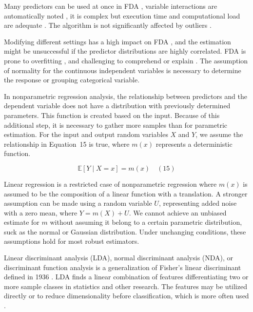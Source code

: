 \documentclass[preprint,12pt]{elsarticle}
\begin{document}
Many predictors can be used at once in FDA \cite{hastie2009elements}, variable interactions are automatically noted \cite{hastie1994flexible}, it is complex but execution time and computational load are adequate \cite{reynes2006choice}. The algorithm is not significantly affected by outliers \cite{phillips2017applying}.

Modifying different settings has a high impact on FDA \cite{hallgren2019species}, and the estimation might be unsuccessful if the predictor distributions are highly correlated. FDA is prone to overfitting \cite{thuiller2016ensemble}, and challenging to comprehend or explain \cite{quillfeldt2017influence}. The assumption of normality for the continuous independent variables is necessary \cite{zhang2019using} to determine the response or grouping categorical variable. 

In nonparametric regression analysis, the relationship between predictors and the dependent variable does not have a distribution with previously determined parameters. This function is created based on the input. Because of this additional step, it is necessary to gather more samples than for parametric estimation. For the input and output random variables $X$ and $Y$, we assume the relationship in Equation~15 is true, where $m\left(x\right)$ represents a deterministic function.

\begin{equation}
	\mathbb{E}[Y\mid X=x]=m\left(x\right)
	\quad\left(15\right)
\end{equation}

Linear regression is a restricted case of nonparametric regression where $m\left(x\right)$ is assumed to be the composition of a linear function with a translation. A stronger assumption can be made using a random variable $U$, representing added noise with a zero mean, where $Y=m\left(X\right)+U$. We cannot achieve an unbiased estimate for $m$ without assuming it belong to a certain parametric distribution, suck as the normal or Gaussian distribution. Under unchanging conditions, these assumptions hold for most robust estimators.

Linear discriminant analysis (LDA), normal discriminant analysis (NDA), or discriminant function analysis is a generalization of Fisher's linear discriminant defined in 1936 \cite{cohen2013applied}. LDA finds a linear combination of features differentiating two or more sample classes in statistics and other research. The features may be utilized directly or to reduce dimensionality before classification, which is more often used \cite{hansen2005using}.
\end{document}
